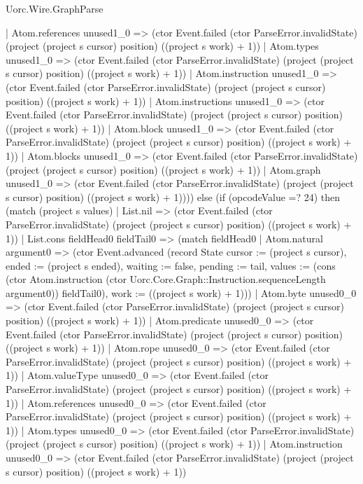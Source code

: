 \begin{lexlean}{Uorc.Wire.GraphParse}
\begin{semanticmodule}
{          | Atom.references unused1_0 => (ctor Event.failed (ctor ParseError.invalidState) (project (project s cursor) position) ((project s work) + 1))
          | Atom.types unused1_0 => (ctor Event.failed (ctor ParseError.invalidState) (project (project s cursor) position) ((project s work) + 1))
          | Atom.instruction unused1_0 => (ctor Event.failed (ctor ParseError.invalidState) (project (project s cursor) position) ((project s work) + 1))
          | Atom.instructions unused1_0 => (ctor Event.failed (ctor ParseError.invalidState) (project (project s cursor) position) ((project s work) + 1))
          | Atom.block unused1_0 => (ctor Event.failed (ctor ParseError.invalidState) (project (project s cursor) position) ((project s work) + 1))
          | Atom.blocks unused1_0 => (ctor Event.failed (ctor ParseError.invalidState) (project (project s cursor) position) ((project s work) + 1))
          | Atom.graph unused1_0 => (ctor Event.failed (ctor ParseError.invalidState) (project (project s cursor) position) ((project s work) + 1)))) else (if (opcodeValue =? 24) then (match (project s values)
        | List.nil => (ctor Event.failed (ctor ParseError.invalidState) (project (project s cursor) position) ((project s work) + 1))
        | List.cons fieldHead0 fieldTail0 => (match fieldHead0
          | Atom.natural argument0 => (ctor Event.advanced (record State {cursor := (project s cursor), ended := (project s ended), waiting := false, pending := tail, values := (cons (ctor Atom.instruction (ctor Uorc.Core.Graph::Instruction.sequenceLength argument0)) fieldTail0), work := ((project s work) + 1)}))
          | Atom.byte unused0_0 => (ctor Event.failed (ctor ParseError.invalidState) (project (project s cursor) position) ((project s work) + 1))
          | Atom.predicate unused0_0 => (ctor Event.failed (ctor ParseError.invalidState) (project (project s cursor) position) ((project s work) + 1))
          | Atom.rope unused0_0 => (ctor Event.failed (ctor ParseError.invalidState) (project (project s cursor) position) ((project s work) + 1))
          | Atom.valueType unused0_0 => (ctor Event.failed (ctor ParseError.invalidState) (project (project s cursor) position) ((project s work) + 1))
          | Atom.references unused0_0 => (ctor Event.failed (ctor ParseError.invalidState) (project (project s cursor) position) ((project s work) + 1))
          | Atom.types unused0_0 => (ctor Event.failed (ctor ParseError.invalidState) (project (project s cursor) position) ((project s work) + 1))
          | Atom.instruction unused0_0 => (ctor Event.failed (ctor ParseError.invalidState) (project (project s cursor) position) ((project s work) + 1))
}
\end{semanticmodule}
\end{lexlean}
